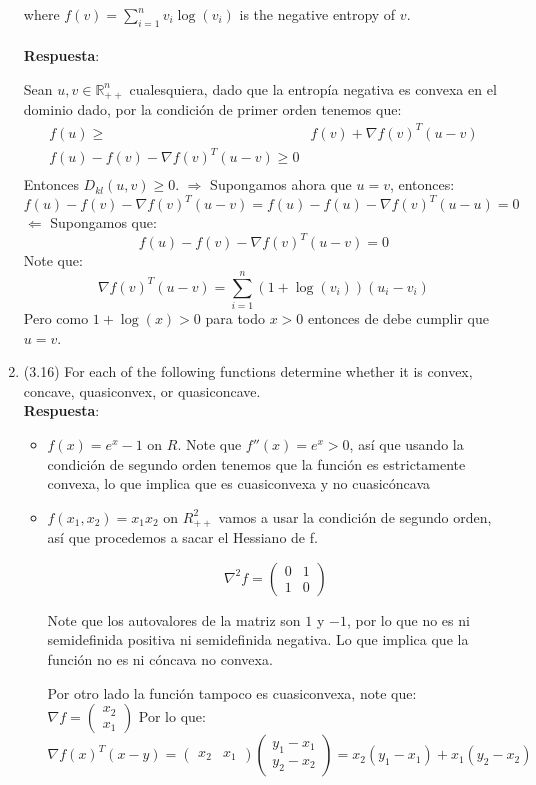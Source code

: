 \documentclass[12pt, oneside]{article}%
\begin{document}
\begin{enumerate}
where $f(v) = \sum_{i=1}^n v_i \log (v_i)$ is the negative entropy of $v$.\\ \\
\textbf{Respuesta}: 

Sean $u,v\in \mathbb{R}_{++}^n$ cualesquiera, dado que la entropía negativa es convexa en el dominio dado, por la condición de primer orden tenemos que:
\begin{align*}
    f(u)\geq &f(v)+\nabla f(v)^T(u-v)\\
    f(u)-f(v)-\nabla f(v)^T(u-v)\geq 0\\
\end{align*}
Entonces $D_{kl}(u,v) \geq 0$.
$\Rightarrow$ Supongamos ahora que $u=v$, entonces:
$$f(u) - f(v) - \nabla f(v)^T(u-v)=f(u) - f(u) - \nabla f(v)^T(u-u)=0$$
$\Leftarrow$ Supongamos que:
$$f(u) - f(v) - \nabla f(v)^T(u-v)=0$$
Note que:
$$\nabla f(v)^T(u-v)=\sum_{i=1}^n (1+\log (v_i))(u_i-v_i)$$
Pero como $1+\log (x)>0$ para todo $x>0$ entonces de debe cumplir que $u=v$.
\item (3.16) For each of the following functions determine whether it is convex, concave, quasiconvex, or quasiconcave. \\

\textbf{Respuesta}: 

\begin{itemize}
    \item $f(x) = e^x - 1$ on $R$.
    Note que $f''(x) = e^x > 0$, así que usando la condición de segundo orden tenemos que la función es estrictamente convexa, lo que implica que es cuasiconvexa y no cuasicóncava 
 
    
    \item $f(x_1,x_2) = x_1x_2$ on $R_{++}^2$
    vamos a usar la condición de segundo orden, así que procedemos a sacar el Hessiano de f. 
    
    $$ \nabla^2 f = \begin{pmatrix}
                    0 & 1\\
                    1 & 0
                    \end{pmatrix} $$
    
    Note que los autovalores de la matriz son $1$ y $-1$, por lo que no es ni semidefinida positiva ni semidefinida negativa. Lo que implica que la función no es ni cóncava no convexa. 
    
    Por otro lado la función tampoco es cuasiconvexa, note que:  $\nabla f =  \begin{pmatrix} x_2\\ x_1 \end{pmatrix} $ 
    Por lo que: 
    $$\nabla f(x)^T(x-y) = \begin{pmatrix} x_2 & x_1 \end{pmatrix} \begin{pmatrix} y_1 - x_1 \\ y_2 - x_2 \end{pmatrix} = x_2(y_1-x_1) + x_1(y_2-x_2)$$
    

\end{itemize}
\end{enumerate}
\end{document}
